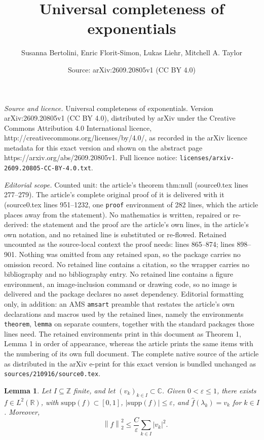 \documentclass[10pt,a4paper]{amsart}
\title{Universal completeness of exponentials}
\author{Susanna Bertolini, Enric Florit-Simon, Lukas Liehr, Mitchell A. Taylor}
\date{Source: arXiv:2609.20805v1 (CC BY 4.0)}
\newtheorem{lemma}{Lemma}
\def\C{{\mathbb C}}
\def\R{{\mathbb R}}
\def\Z{{\mathbb Z}}
\newcommand{\norm}[1]{\left\lVert #1 \right\rVert}
\newcommand{\supp}{{\mathrm{supp}}}
\begin{document}
\maketitle

\noindent\emph{Source and licence.} Universal completeness of exponentials. Version arXiv:2609.20805v1 (CC BY 4.0), distributed by arXiv under the Creative Commons Attribution 4.0 International licence, http://creativecommons.org/licenses/by/4.0/, as recorded in the arXiv licence metadata for this exact version and shown on the abstract page https://arxiv.org/abs/2609.20805v1. Full licence notice: \texttt{licenses/arxiv-2609.20805-CC-BY-4.0.txt}.\par\smallskip

\noindent\textit{Editorial scope.} Counted unit: the article's theorem thm:null (source0.tex lines 277--279). The article's complete original proof of it is delivered with it (source0.tex lines 951--1232, one \texttt{proof} environment of 282 lines, which the article places away from the statement). No mathematics is written, repaired or re-derived: the statement and the proof are the article's own lines, in the article's own notation, and no retained line is substituted or re-flowed.  Retained uncounted as the source-local context the proof needs: lines 865--874; lines 898--901.  Nothing was omitted from any retained span, so the package carries no omission record.  No retained line contains a citation, so the wrapper carries no bibliography and no bibliography entry.  No retained line contains a figure environment, an image-inclusion command or drawing code, so no image is delivered and the package declares no asset dependency.  Editorial formatting only, in addition: an AMS \texttt{amsart} preamble that restates the article's own declarations and macros used by the retained lines, namely the environments \texttt{theorem}, \texttt{lemma} on separate counters, together with the standard packages those lines need.  The retained environments print in this document as Theorem 1, Lemma 1 in order of appearance, whereas the article prints the same items with the numbering of its own full document.  The complete native source of the article as distributed in the arXiv e-print for this exact version is bundled unchanged as \texttt{sources/210916/source0.tex}.
\begin{lemma}
\label{lem:asymp-thin-interpolation}
Let 
\(I\subseteq\Z\) finite, and let
\((v_k)_{k\in I} \subset\C\). Given \(0<\varepsilon\leq1\), there exists
\(f\in L^2(\R)\), with $\supp (f)\subset [0,1]$, $|\supp (f)|\leq \varepsilon$, and $\hat f(\lambda_k)=v_k$ for $k\in I$.
Moreover,
$$\quad
    \norm{f}_2^2\leq\frac{C}{\varepsilon}\sum_{k\in I}|v_k|^2.$$
\end{lemma}
\end{document}
